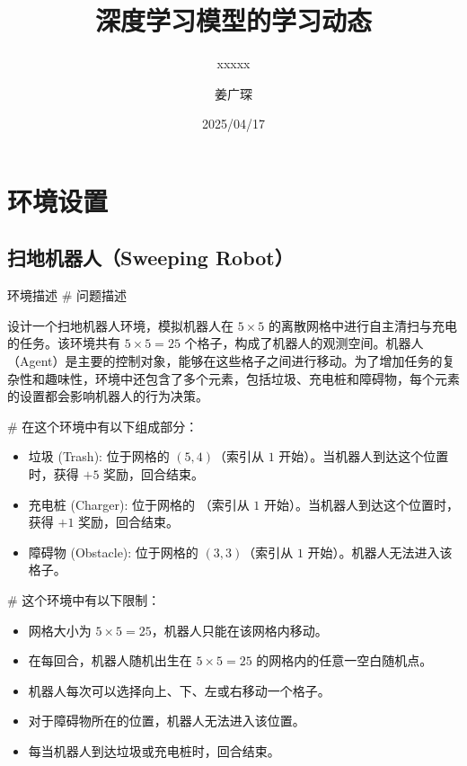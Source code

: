 \documentclass[citestyle=gb7714-2015, bibstyle=gb7714-2015,lang=cn,14pt,scheme=chinese]{elegantbook}
\title{深度学习模型的学习动态}
\subtitle{xxxxx}
\author{姜广琛}
\institute{西北工业大学}
\date{2025/04/17}
\begin{document}


\mainmatter%

\chapter{环境设置}

\section{扫地机器人（Sweeping Robot）}

\begin{definition*}{环境描述}
\# 问题描述

    设计一个扫地机器人环境，模拟机器人在 \(5 \times 5\) 的离散网格中进行自主清扫与充电的任务。该环境共有 \(5 \times 5 = 25\) 个格子，构成了机器人的观测空间。机器人（Agent）是主要的控制对象，能够在这些格子之间进行移动。为了增加任务的复杂性和趣味性，环境中还包含了多个元素，包括垃圾、充电桩和障碍物，每个元素的设置都会影响机器人的行为决策。

\# 在这个环境中有以下组成部分：
    \begin{itemize}
        \item 垃圾 (Trash): 位于网格的 \(\left( 5, 4 \right)\)（索引从 \(1\) 开始）。当机器人到达这个位置时，获得 \(+5\) 奖励，回合结束。
        \item 充电桩 (Charger): 位于网格的 （索引从 \(1\) 开始）。当机器人到达这个位置时，获得 \(+1\) 奖励，回合结束。
        \item 障碍物 (Obstacle): 位于网格的 \(\left( 3, 3 \right)\)（索引从 \(1\) 开始）。机器人无法进入该格子。
    \end{itemize}

\# 这个环境中有以下限制：
\begin{itemize}
    \item 网格大小为 \(5 \times 5 = 25\)，机器人只能在该网格内移动。
    \item 在每回合，机器人随机出生在 \(5 \times 5 = 25\) 的网格内的任意一空白随机点。
    \item 机器人每次可以选择向上、下、左或右移动一个格子。
    \item 对于障碍物所在的位置，机器人无法进入该位置。
    \item 每当机器人到达垃圾或充电桩时，回合结束。
\end{itemize}
\end{definition*}
\end{document}
